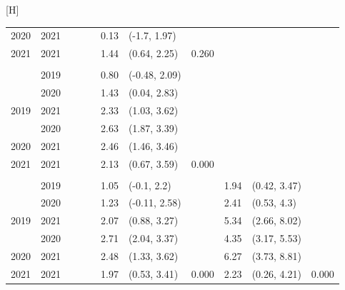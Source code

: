 \documentclass[
  letterpaper,
  DIV=11,
  numbers=noendperiod]{scrartcl}
\makeatletter
\renewenvironment{table}%
  {\renewcommand\familydefault\sfdefault
   \@float{table}}
  {\end@float}
\makeatother
\begin{document}
\begin{table}[H]
\begin{tabular}{rrrllrllrll}
\cmidrule{2-11}
\multirow[t]{-2}{*}{\raggedleft\arraybackslash \hspace{1em}2020} & 2021 &  &  &  & 0.13 & (-1.7, 1.97) &  &  &  & \\
\cmidrule{1-11}
\hspace{1em}2021 & 2021 &  &  &  & 1.44 & (0.64, 2.25) & 0.260 &  &  & \\
\cmidrule{1-11}
\addlinespace[0.3em]
\multicolumn{11}{l}{\textbf{Daytime heating}}\\
 & 2019 &  &  &  & 0.80 & (-0.48, 2.09) &  &  &  & \\
\cmidrule{2-11}
 & 2020 &  &  &  & 1.43 & (0.04, 2.83) &  &  &  & \\
\cmidrule{2-11}
\multirow[t]{-3}{*}{\raggedleft\arraybackslash \hspace{1em}2019} & 2021 &  &  &  & 2.33 & (1.03, 3.62) &  &  &  & \\
\cmidrule{1-11}
 & 2020 &  &  &  & 2.63 & (1.87, 3.39) &  &  &  & \\
\cmidrule{2-11}
\multirow[t]{-2}{*}{\raggedleft\arraybackslash \hspace{1em}2020} & 2021 &  &  &  & 2.46 & (1.46, 3.46) &  &  &  & \\
\cmidrule{1-11}
\hspace{1em}2021 & 2021 &  &  &  & 2.13 & (0.67, 3.59) & 0.000 &  &  & \\
\cmidrule{1-11}
\addlinespace[0.3em]
\multicolumn{11}{l}{\textbf{Heating season}}\\
 & 2019 &  &  &  & 1.05 & (-0.1, 2.2) &  & 1.94 & (0.42, 3.47) & \\
\cmidrule{2-11}
 & 2020 &  &  &  & 1.23 & (-0.11, 2.58) &  & 2.41 & (0.53, 4.3) & \\
\cmidrule{2-11}
\multirow[t]{-3}{*}{\raggedleft\arraybackslash \hspace{1em}2019} & 2021 &  &  &  & 2.07 & (0.88, 3.27) &  & 5.34 & (2.66, 8.02) & \\
\cmidrule{1-11}
 & 2020 &  &  &  & 2.71 & (2.04, 3.37) &  & 4.35 & (3.17, 5.53) & \\
\cmidrule{2-11}
\multirow[t]{-2}{*}{\raggedleft\arraybackslash \hspace{1em}2020} & 2021 &  &  &  & 2.48 & (1.33, 3.62) &  & 6.27 & (3.73, 8.81) & \\
\cmidrule{1-11}
\hspace{1em}2021 & 2021 &  &  &  & 1.97 & (0.53, 3.41) & 0.000 & 2.23 & (0.26, 4.21) & 0.000\\
\bottomrule
\end{tabular}
\endgroup{}
\end{table}
\end{document}
